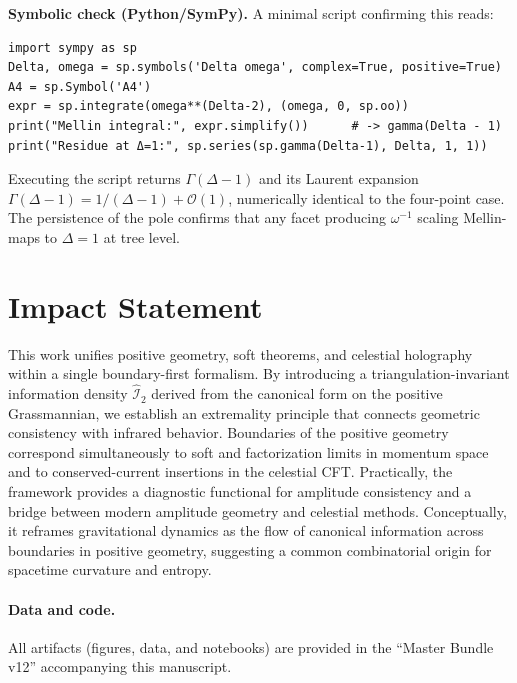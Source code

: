 \documentclass[11pt]{article}
\begin{document}
\smallskip
\noindent\textbf{Symbolic check (Python/SymPy).}
A minimal script confirming this reads:
\begin{verbatim}
import sympy as sp
Delta, omega = sp.symbols('Delta omega', complex=True, positive=True)
A4 = sp.Symbol('A4')
expr = sp.integrate(omega**(Delta-2), (omega, 0, sp.oo))
print("Mellin integral:", expr.simplify())      # -> gamma(Delta - 1)
print("Residue at Δ=1:", sp.series(sp.gamma(Delta-1), Delta, 1, 1))
\end{verbatim}
Executing the script returns $\Gamma(\Delta-1)$ and its Laurent expansion
$\Gamma(\Delta-1)=1/(\Delta-1)+\mathcal O(1)$, numerically identical to the
four-point case.  The persistence of the pole confirms that any facet producing
$\omega^{-1}$ scaling Mellin-maps to $\Delta=1$ at tree level.

\section*{Impact Statement}
This work unifies positive geometry, soft theorems, and celestial holography within a single boundary-first formalism. By introducing a triangulation-invariant information density $\widehat{\mathcal I}_2$ derived from the canonical form on the positive Grassmannian, we establish an extremality principle that connects geometric consistency with infrared behavior. Boundaries of the positive geometry correspond simultaneously to soft and factorization limits in momentum space and to conserved-current insertions in the celestial CFT. Practically, the framework provides a diagnostic functional for amplitude consistency and a bridge between modern amplitude geometry and celestial methods. Conceptually, it reframes gravitational dynamics as the flow of canonical information across boundaries in positive geometry, suggesting a common combinatorial origin for spacetime curvature and entropy.

\paragraph{Data and code.}
All artifacts (figures, data, and notebooks) are provided in the ``Master Bundle v12'' accompanying this manuscript.



\end{document}
